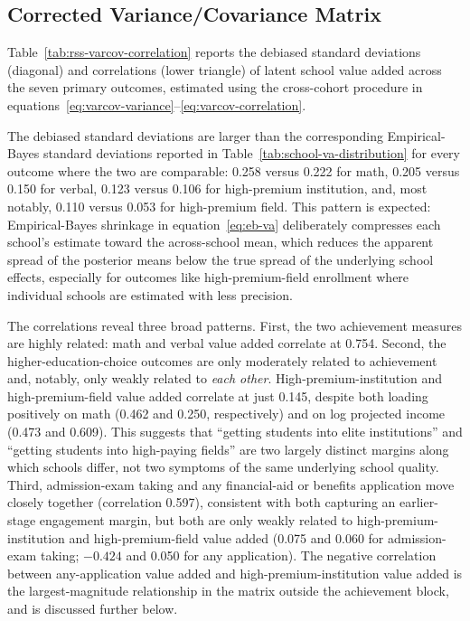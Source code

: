 \documentclass[a4paper, article, english, oneside, unknownkeysallowed, 12pt]{memoir}
\begin{document}



\subsection{Corrected Variance/Covariance Matrix}

Table~\ref{tab:rss-varcov-correlation} reports the debiased standard deviations (diagonal) and correlations (lower triangle) of latent school value added across the seven primary outcomes, estimated using the cross-cohort procedure in equations~\eqref{eq:varcov-variance}--\eqref{eq:varcov-correlation}.



The debiased standard deviations are larger than the corresponding Empirical-Bayes standard deviations reported in Table~\ref{tab:school-va-distribution} for every outcome where the two are comparable: 0.258 versus 0.222 for math, 0.205 versus 0.150 for verbal, 0.123 versus 0.106 for high-premium institution, and, most notably, 0.110 versus 0.053 for high-premium field.
This pattern is expected: Empirical-Bayes shrinkage in equation~\eqref{eq:eb-va} deliberately compresses each school's estimate toward the across-school mean, which reduces the apparent spread of the posterior means below the true spread of the underlying school effects, especially for outcomes like high-premium-field enrollment where individual schools are estimated with less precision.

The correlations reveal three broad patterns.
First, the two achievement measures are highly related: math and verbal value added correlate at 0.754.
Second, the higher-education-choice outcomes are only moderately related to achievement and, notably, only weakly related to \emph{each other}.
High-premium-institution and high-premium-field value added correlate at just 0.145, despite both loading positively on math (0.462 and 0.250, respectively) and on log projected income (0.473 and 0.609).
This suggests that ``getting students into elite institutions'' and ``getting students into high-paying fields'' are two largely distinct margins along which schools differ, not two symptoms of the same underlying school quality.
Third, admission-exam taking and any financial-aid or benefits application move closely together (correlation 0.597), consistent with both capturing an earlier-stage engagement margin, but both are only weakly related to high-premium-institution and high-premium-field value added (0.075 and 0.060 for admission-exam taking; $-0.424$ and 0.050 for any application).
The negative correlation between any-application value added and high-premium-institution value added is the largest-magnitude relationship in the matrix outside the achievement block, and is discussed further below.
\end{document}
